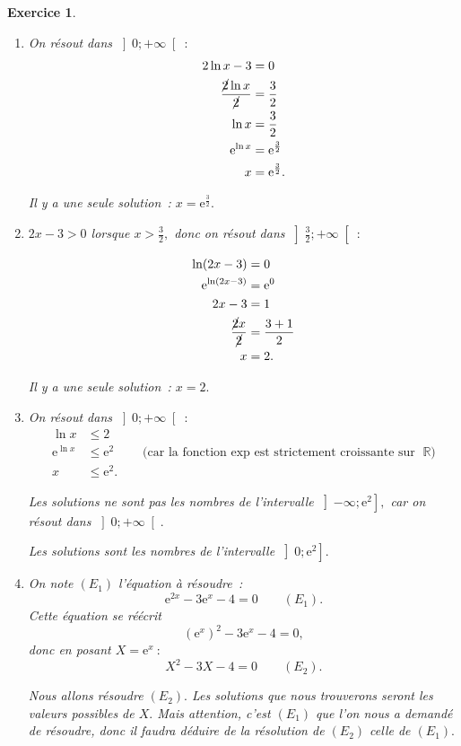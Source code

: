 \documentclass[10pt]{article}
\newtheorem{exo}{Exercice}
\begin{document}
\begin{exo}
\begin{enumerate}
\item On résout dans $\left]0;+\infty\right[~:$
\begin{align*}2\ln x-3&=0\\
\frac{\cancel{2}\ln x}{\cancel{2}}&=\frac{3}{2}
\\ \ln x&=\frac{3}{2}\\
\text{e}^{\ln x}&=\text{e}^{\frac{3}{2}}\\
x&=\text{e}^{\frac{3}{2}}.
\end{align*}

Il y a une seule solution~: $x=\text{e}^{\frac{3}{2}}.$



\item $2x-3>0$ lorsque $x>\frac{3}{2},$ donc on résout dans $\left]\frac{3}{2};+\infty\right[~:$

\begin{align*}
\ln(2x-3)&= 0\\
\text{e}^{\ln (2x-3)}&=\text{e}^{0}\\
2x-3&= 1\\
\frac{\cancel{2}x}{\cancel{2}}&=\frac{3+1}{2}\\
x&= 2.
\end{align*}

Il y a une seule solution~: $x=2.$


\item On résout dans $\left]0;+\infty\right[~:$
\begin{align*}\ln x&\leq 2\\
\text{e}^{\ln x}&\leq \text{e}^{2}\qquad \text{(car la fonction $\exp$ est strictement croissante sur }\mathbb{R})\\
x&\leq \text{e}^{2}.
\end{align*}

\danger Les solutions ne sont pas les nombres de l'intervalle $\left]-\infty;\text{e}^{2}\right],$ car on résout dans $\left]0;+\infty\right[.$

\medskip

Les solutions sont les nombres de l'intervalle $\left]0;\text{e}^{2}\right].$


\item On note $\left(E_1\right)$ l'équation à résoudre~: \[\text{e}^{2x}-3\text{e}^x-4=0\qquad \left(E_1\right).\] Cette équation se réécrit \[\left(\text{e}^{x}\right)^2-3\text{e}^x-4=0,\] donc en posant $X=\text{e}^x~:$
\[X^2-3X-4=0\qquad \left(E_2\right).\]

\medskip

Nous allons résoudre $\left(E_2\right).$ Les solutions que nous trouverons seront les valeurs possibles de $X.$ Mais attention, c'est $\left(E_1\right)$ que l'on nous a demandé de résoudre, donc il faudra déduire de la résolution de $\left(E_2\right)$ celle de $\left(E_1\right).$


\end{enumerate}
\end{exo}
\end{document}
